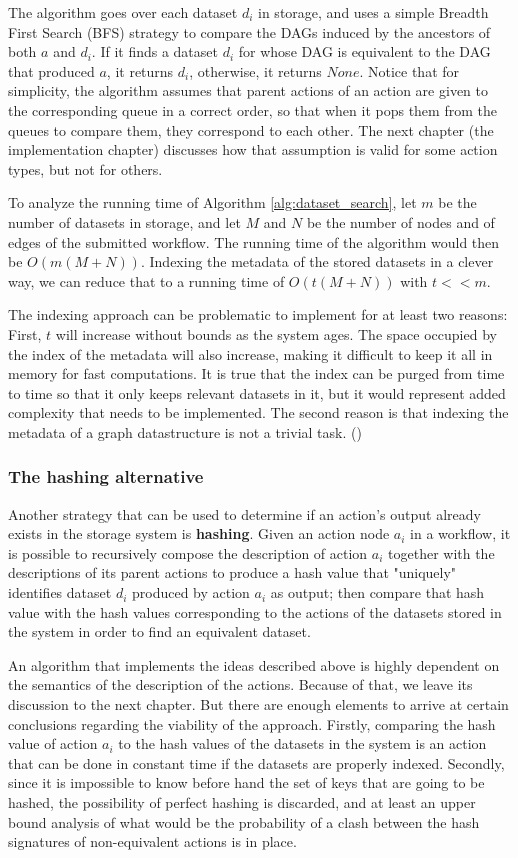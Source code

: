 The algorithm goes over each dataset $d_i$ in storage, and uses a simple Breadth First Search (BFS) strategy to compare the DAGs induced by the ancestors of both $a$ and $d_i$.  If it finds a dataset $d_i$ for whose DAG is equivalent to the DAG that produced $a$, it returns $d_i$, otherwise, it returns $None$.  Notice that for simplicity, the algorithm assumes that parent actions of an action are given to the corresponding queue in a correct order, so that when it pops them from the queues to compare them, they correspond to each other.  The next chapter (the implementation chapter) discusses how that assumption is valid for some action types, but not for others.

To analyze the running time of Algorithm \ref{alg:dataset_search}, let $m$ be the number of datasets in storage, and let $M$ and $N$ be the number of nodes and of edges of the submitted workflow.  The running time of the algorithm would then be $O(m (M + N))$.  Indexing the metadata of the stored datasets in a clever way, we can reduce that to a running time of $O(t (M + N))$ with $t << m$.

The indexing approach can be problematic to implement for at least two reasons: First, $t$ will increase without bounds as the system ages. The space occupied by the index of the metadata will also increase, making it difficult to keep it all in memory for fast computations. It is true that the index can be purged from time to time so that it only keeps relevant datasets in it, but it would represent added complexity that needs to be implemented.  The second reason is that indexing the metadata of a graph datastructure is not a trivial task. (\cite{simmhan2005survey})

\subsubsection{The hashing alternative}
\label{sec:encryption}
Another strategy that can be used to determine if an action's output already exists in the storage system is \textbf{hashing}.  Given an action node $a_i$ in a workflow, it is possible to recursively compose the description of action $a_i$ together with the descriptions of its parent actions to produce a hash value that "uniquely" identifies dataset $d_i$ produced by action $a_i$ as output; then compare that hash value with the hash values corresponding to the actions of the datasets stored in the system in order to find an equivalent dataset.

An algorithm that implements the ideas described above is highly dependent on the semantics of the description of the actions.  Because of that, we leave its discussion to the next chapter.  But there are enough elements to arrive at certain conclusions regarding the viability of the approach.  Firstly, comparing the hash value of action $a_i$ to the hash values of the datasets in the system is an action that can be done in constant time if the datasets are properly indexed.  Secondly, since it is impossible to know before hand the set of keys that are going to be hashed, the possibility of perfect hashing is discarded, and at least an upper bound analysis of what would be the probability of a clash between the hash signatures of non-equivalent actions is in place.  

